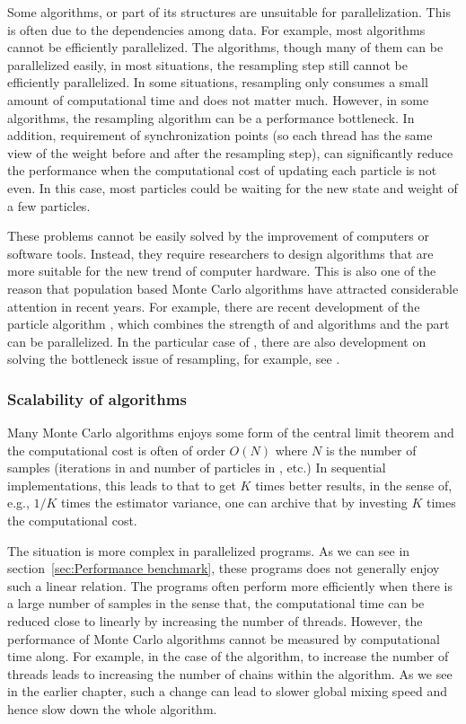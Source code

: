 Some algorithms, or part of its structures are unsuitable for parallelization.
This is often due to the dependencies among data. For example, most \mcmc
algorithms cannot be efficiently parallelized. The \smc algorithms, though
many of them can be parallelized easily, in most situations, the resampling
step still cannot be efficiently parallelized. In some situations, resampling
only consumes a small amount of computational time and does not matter much.
However, in some algorithms, the resampling algorithm can be a performance
bottleneck. In addition, requirement of synchronization points (so each thread
has the same view of the weight before and after the resampling step), can
significantly reduce the performance when the computational cost of updating
each particle is not even. In this case, most particles could be waiting for
the new state and weight of a few particles.

These problems cannot be easily solved by the improvement of computers or
software tools. Instead, they require researchers to design algorithms that
are more suitable for the new trend of computer hardware. This is also one of
the reason that population based Monte Carlo algorithms have attracted
considerable attention in recent years. For example, there are recent
development of the particle \mcmc algorithm \cite{Andrieu:2010gc}, which
combines the strength of \mcmc and \smc algorithms and the \smc part can be
parallelized. In the particular case of \smc, there are also development on
solving the bottleneck issue of resampling, for example, see
\cite{presampling}.

\subsubsection{Scalability of algorithms}
\label{ssub:Scalability of algorithms}

Many Monte Carlo algorithms enjoys some form of the central limit theorem and
the computational cost is often of order $O(N)$ where $N$ is the number of
samples (iterations in \mcmc and number of particles in \smc, etc.) In
sequential implementations, this leads to that to get $K$ times better
results, in the sense of, e.g., $1/K$ times the estimator variance, one can
archive that by investing $K$ times the computational cost.

The situation is more complex in parallelized programs. As we can see in
section~\ref{sec:Performance benchmark}, these programs does not generally
enjoy such a linear relation. The programs often perform more efficiently when
there is a large number of samples in the sense that, the computational time
can be reduced close to linearly by increasing the number of threads. However,
the performance of Monte Carlo algorithms cannot be measured by computational
time along. For example, in the case of the \pmcmc algorithm, to increase the
number of threads leads to increasing the number of \mcmc chains within the
algorithm. As we see in the earlier chapter, such a change can lead to slower
global mixing speed and hence slow down the whole algorithm.

